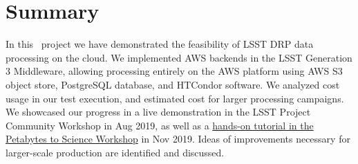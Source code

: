 \section{Summary}

In this \poc~project we have demonstrated the feasibility of LSST DRP data processing on the cloud.
We implemented AWS backends in the LSST Generation 3 Middleware, allowing processing entirely on the AWS platform using AWS S3 object store, PostgreSQL database, and HTCondor software.
We analyzed cost usage in our test execution, and estimated cost for larger processing campaigns.
We showcased our progress in a live demonstration in the LSST Project Community Workshop in Aug 2019, as well as a \href{https://confluence.lsstcorp.org/display/DM/Tutorials+at+the+Kavli+workshop}{hands-on tutorial in the Petabytes to Science Workshop} in Nov 2019.
Ideas of improvements necessary for larger-scale production are identified and discussed.
